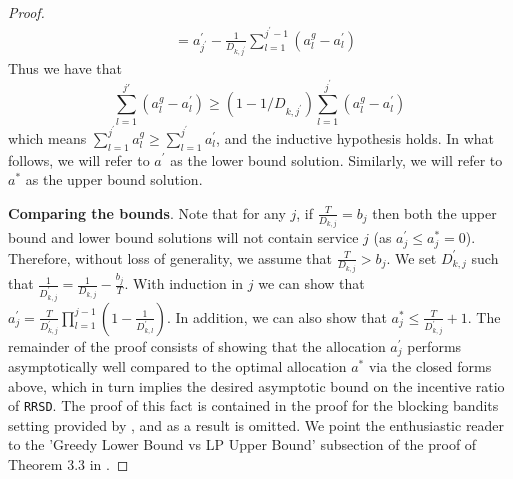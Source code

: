 \documentclass[letterpaper,11pt]{article}
\newcommand{\kibitz}[2]{\ifnum\Comments=1{\color{#1}{#2}}\fi}
\newcommand{\ltt}[1]{\kibitz{red}{[Long: #1]}}
\begin{document}
\begin{proof}
\begin{align*}
        &=  a^{\prime}_{j^{\prime}} - \frac{1}{D_{k, j^{\prime}}}\sum^{j^{\prime}-1}_{l=1}\left(a^{g}_{l} - a^{\prime}_{l}\right)
    \end{align*}
    Thus we have that 
    \begin{equation*}
        \sum^{j'}_{l=1}(a^{g}_{l} - a^{\prime}_{l}) \geq (1 - 1/D_{k, j^{\prime}})\sum^{j^{\prime}}_{l=1}(a^{g}_{l} - a^{\prime}_{l})
    \end{equation*}
    which means $\sum^{j^{\prime}}_{l=1}a^{g}_{l} \geq \sum^{j^{\prime}}_{l=1}a^{\prime}_{l}$, and the inductive hypothesis holds. In what follows, we will refer to $a^{\prime}$ as the lower bound solution. Similarly, we will refer to $a^{*}$ as the upper bound solution.
    
 \textbf{Comparing the bounds}.  
Note that for any $j$, if $\frac{T}{D_{k,j}} = b_j$ then both the upper bound and lower bound solutions will not contain service $j$ (as $a^{\prime}_j \leq a^*_j = 0$).  
Therefore, without loss of generality, we assume that 
$\frac{T}{D_{k,j}} > b_j$. 
We set $D^{\prime}_{k,j}$ such that $\frac{1}{D^{\prime}_{k,j}} = \frac{1}{D_{k,j}} - \frac{b_j}{T}$. 
With induction in $j$ we can show that $a^{\prime}_j = \frac{T}{D^{\prime}_{k, j}}\prod_{l=1}^{j-1}(1-\frac{1}{D^{\prime}_{k, l}})$. 
In addition, we can also show that $a^*_j \leq \frac{T}{D^{\prime}_{k,j}} +1$.
%
The remainder of the proof consists of showing that the allocation $a^{\prime}_{j}$ performs asymptotically well compared to the optimal allocation $a^{*}$ via the closed forms above, which in turn implies the desired asymptotic bound on the incentive ratio of \texttt{RRSD}. The proof of this fact is contained in the proof for the blocking bandits setting provided by \cite{Basu:2019ui}, and as a result is omitted. We point the enthusiastic reader to the 'Greedy Lower Bound vs LP Upper Bound' subsection of the proof of Theorem 3.3 in \cite{Basu:2019ui}.

\end{proof}
\end{document}
